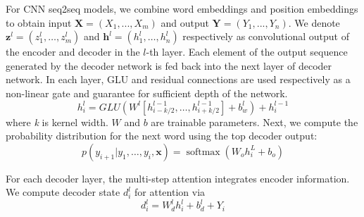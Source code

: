 
For CNN seq2seq models, we combine word embeddings and position embeddings to obtain input $\mathbf{X} = (X_1,...,X_m)$ and output $\mathbf{Y}=(Y_1,...,Y_n)$. 
We denote $\mathbf { z } ^ { l } = \left( z _ { 1 } ^ { l } , \ldots , z _ { m     } ^ { l } \right)$ and $\mathbf { h } ^ { l } = \left( h _ { 1 } ^ { l } , \ldots , h _ { n } ^ { l } \right)$ 
respectively as convolutional output of the encoder and
decoder in the $l$-th layer.
Each element of the output
sequence generated by the decoder network is fed
back into the next layer of decoder network.
In each layer, GLU \citep{DauphinFAG17} and residual connections \citep{HeZRS16}
are used respectively as a non-linear gate and guarantee for sufficient depth of the network.  
\begin{equation}
    h _ { i } ^ { l } = GLU \left( W ^ { l } \left[ h _ {i-k/2 } ^ { l - 1 } , \ldots , h _ { i+k/2 } ^ { l - 1 } \right] + b _ { w } ^ { l } \right) + h _ { i } ^ { l - 1 }
\end{equation} 
where \textit{k} is kernel width. $W$ and $b$ are trainable parameters.
Next, we compute the probability distribution for the next word
using the top decoder output:
\begin{equation}
    p \left( y _ { i + 1 } | y _ { 1 } , \ldots , y _ { i } , \mathbf { x } \right) = \operatorname { softmax } \left( W _ { o } h _ { i } ^ { L } + b _ { o } \right)
\end{equation}

For each decoder layer, the multi-step attention integrates encoder information. 
We compute decoder state $d_{i}^{l}$ for attention via
\begin{equation}
    d _ { i } ^ { l } = W _ { d } ^ { l } h _ { i } ^ { l } + b _ { d } ^ { l } + Y _ { i }
\end{equation}

